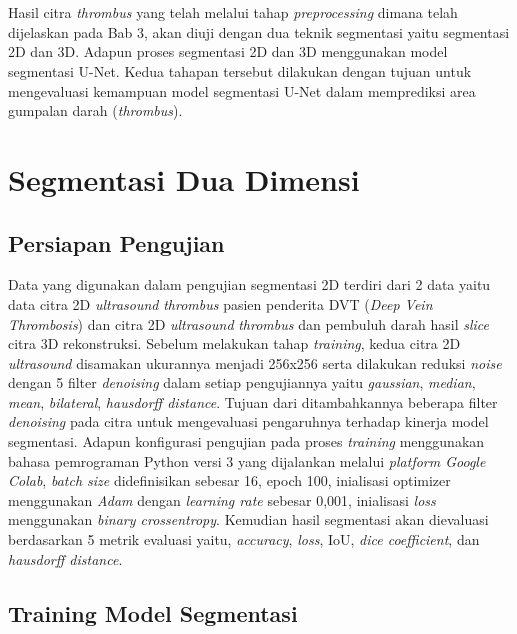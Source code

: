 \section*{ }

Hasil citra \textit{thrombus} yang telah melalui tahap \textit{preprocessing} dimana telah dijelaskan pada Bab 3, akan diuji dengan dua teknik segmentasi yaitu segmentasi 2D dan 3D. Adapun proses segmentasi 2D dan 3D menggunakan model segmentasi U-Net. Kedua tahapan tersebut dilakukan dengan tujuan untuk mengevaluasi kemampuan model segmentasi U-Net dalam memprediksi area gumpalan darah (\textit{thrombus}).


\section{Segmentasi Dua Dimensi}
\subsection{Persiapan Pengujian}
Data yang digunakan dalam pengujian segmentasi 2D terdiri dari 2 data yaitu data citra 2D \textit{ultrasound} \textit{thrombus} pasien penderita DVT (\textit{Deep Vein Thrombosis}) dan citra 2D \textit{ultrasound} \textit{thrombus} dan pembuluh darah hasil \textit{slice} citra 3D rekonstruksi. Sebelum melakukan tahap \textit{training}, kedua citra 2D \textit{ultrasound} disamakan ukurannya menjadi 256x256 serta dilakukan reduksi \textit{noise} dengan 5 filter \textit{denoising} dalam setiap pengujiannya yaitu \textit{gaussian}, \textit{median}, \textit{mean}, \textit{bilateral}, \textit{hausdorff distance}. Tujuan dari ditambahkannya beberapa filter \textit{denoising} pada citra untuk mengevaluasi pengaruhnya terhadap kinerja model segmentasi. Adapun konfigurasi pengujian pada proses \textit{training} menggunakan bahasa pemrograman Python versi 3 yang dijalankan melalui \textit{platform Google Colab}, \textit{batch size} didefinisikan sebesar 16, epoch 100, inialisasi optimizer menggunakan \textit{Adam} dengan \textit{learning rate} sebesar 0,001, inialisasi \textit{loss} menggunakan \textit{binary crossentropy}. Kemudian hasil segmentasi akan dievaluasi berdasarkan 5 metrik evaluasi yaitu, \textit{accuracy}, \textit{loss}, IoU, \textit{dice coefficient}, dan \textit{hausdorff distance}.

\subsection{Training Model Segmentasi}
